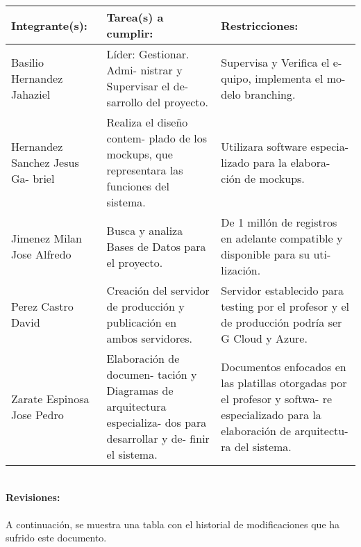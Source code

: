\documentclass[40pt]{article}
\begin{document}
\begin{table}[h!]
\begin{tabular}{|p{4.5 cm}|p{4 cm}|p{4 cm}|}
\hline
\textbf{Integrante(s):}&\textbf{Tarea(s) a cumplir:}&\textbf{Restricciones:}
\\\hline

Basilio Hernandez Jahaziel & Líder: Gestionar. Admi- nistrar y Supervisar el de- sarrollo del proyecto. & Supervisa y Verifica el e- quipo, implementa el mo- delo branching. \\\hline

Hernandez Sanchez Jesus Ga- briel & Realiza el diseño contem- plado de los mockups, que representara las funciones del sistema. & Utilizara software especia- lizado para la elabora- ción de mockups. \\\hline

Jimenez Milan Jose Alfredo & Busca y analiza Bases de Datos para el proyecto. & De 1 millón de registros en adelante compatible y disponible para su uti- lización. \\\hline

Perez Castro David & Creación del servidor de producción y publicación en ambos servidores. & Servidor establecido para testing por el profesor y el de producción podría ser G Cloud y Azure. \\\hline

Zarate Espinosa Jose Pedro & Elaboración de documen- tación y Diagramas de arquitectura especializa- dos para desarrollar y de- finir el sistema. & Documentos enfocados en las platillas otorgadas por el profesor y softwa- re especializado para la elaboración de arquitectu- ra del sistema. \\\hline
\end{tabular}
\end{table}

\newpage

\maketitle
\textsf{\ \\
\textbf{Revisiones:}\\
\\
A continuación, se muestra una tabla con el historial de modificaciones que ha sufrido este documento. \\}
\end{document}
